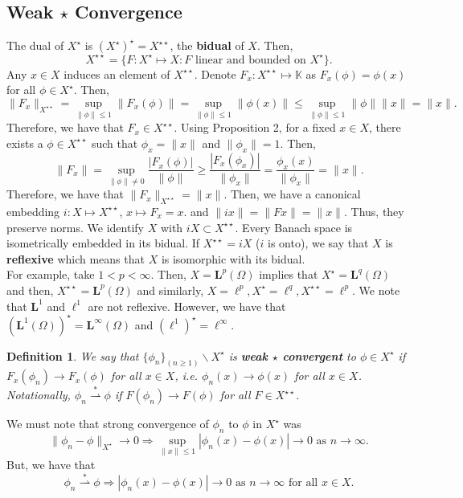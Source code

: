 \documentclass[12pt]{article}
\newtheorem{definition}{Definition}
\def\K{\mathbb{K}}
\newcommand{\Om}{\Omega}
\newcommand{\ml}{\mathbf{L}}
\newcommand{\sbs}{\subset}
\newcommand{\bs}{\backslash}
\newcommand{\lp}{\left(}
\newcommand{\rp}{\right)}
\newcommand{\Xs}{X^{\star}}
\newcommand{\Xss}{X^{\star \star}}
\newcommand{\weaks}{\stackrel{\ast}{\rightharpoonup}}
\begin{document}
\subsection*{Weak $\star$ Convergence}
\vspace{-25pt}
The dual of $\Xs$ is $\lp \Xs \rp^{\star} = \Xss$, the \textbf{bidual} of $X$. Then, 
\[ \Xss = \{ F: \Xs \mapsto X : F \text{ linear and bounded on } \Xs \}.\]
Any $x \in X$ induces an element of $\Xss$. Denote $F_x: \Xss \mapsto \K$ as $F_x(\phi) = \phi(x)$ for all $\phi \in \Xs$. Then, 
\[ \| F_x \|_{\Xss} = \sup\limits_{\| \phi\| \leq 1} \| F_x(\phi)\| =  \sup\limits_{\| \phi\| \leq 1} \| \phi(x)\| \leq  \sup\limits_{\| \phi\| \leq 1} \| \phi \| \| x \| = \| x \|.\]
Therefore, we have that $F_x \in \Xss$. Using Proposition 2, for a fixed $x \in X$, there exists a $\phi \in \Xss$ such that $\phi_x = \| x \|$ and $\| \phi_x\| = 1$. Then, 
\[ \| F_x \| = \sup\limits_{\| \phi \| \neq 0 } \frac{|F_x(\phi)|}{\| \phi\|} \geq \frac{|F_x(\phi_x)|}{\| \phi_x\|} = \frac{\phi_x(x)}{\| \phi_x \|} = \| x \|.\]
Therefore, we have that $\| F_x \|_{\Xss} = \| x \|$. Then, we have a canonical embedding $i: X \mapsto \Xss$, $x \mapsto F_x = x$. and $\| ix \| = \| Fx \| = \| x \|$. Thus, they preserve norms. We identify $X$ with $iX \sbs \Xss$. Every Banach space is isometrically embedded in its bidual. If $\Xss = i X$ ($i$ is onto), we say that $X$ is \textbf{reflexive} which means that $X$ is isomorphic with its bidual.\\
 For example, take $1 < p < \infty$. Then, $X = \ml^p(\Om)$ implies that $\Xs = \ml^q(\Om)$ and then, $\Xss = \ml^p(\Om)$ and similarly, $X = \ell^p, \Xs = \ell^q, \Xss = \ell^p$. We note that $\ml^1$ and $\ell^1$ are not reflexive. However, we have that $\lp \ml^1(\Om) \rp^{\star} = \ml^{\infty} (\Om)$ and $\lp \ell^1 \rp^{\star} = \ell^{\infty}$. 
 \begin{definition}
 We say that $\{ \phi_n\}_{(n \geq 1)} \bs \Xs$ is \textbf{weak $\star$ convergent} to $\phi \in \Xs$ if $F_x(\phi_n) \to F_x(\phi)$ for all $x \in X$, i.e. $\phi_n(x) \to \phi(x)$ for all $x \in X$. Notationally, $\phi_n \weaks \phi$ if $F(\phi_n) \to F(\phi)$ for all $F \in \Xss$. 
 \end{definition}
 \vspace{-25pt}
 We must note that strong convergence of $\phi_n$ to $\phi$ in $\Xs$ was 
 \[ \| \phi_n - \phi \|_{\Xs} \to 0 \Longrightarrow \sup\limits_{\| x \| \leq 1} |\phi_n(x) - \phi(x) | \to 0 \text{ as } n \to \infty.\]
 But, we have that 
 \[ \phi_n \weaks \phi \Longrightarrow | \phi_n(x) - \phi(x) | \to 0 \text{ as } n \to \infty \text{ for all } x \in X. \] 
\end{document}
